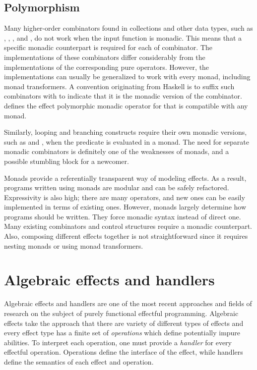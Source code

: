 


\subsection{Polymorphism}
Many higher-order combinators found in collections and other data types, such as , , , and , do not work when the input function is monadic. This means that a specific monadic counterpart is required for each of combinator. The implementations of these combinators differ considerably from the implementations of the corresponding pure operators. However, the implementations can usually be generalized to work with every monad, including monad transformers. A convention originating from Haskell is to suffix such combinators with  to indicate that it is the monadic version of the combinator.  defines the effect polymorphic monadic  operator for  that is compatible with any monad.



Similarly, looping and branching constructs require their own monadic versions, such as  and , when the predicate is evaluated in a monad. The need for separate monadic combinators is definitely one of the weaknesses of monads, and a possible stumbling block for a newcomer.

Monads provide a referentially transparent way of modeling effects. As a result, programs written using monads are modular and can be safely refactored. Expressivity is also high; there are many operators, and new ones can be easily implemented in terms of existing ones. However, monads largely determine how  programs should be written. They force monadic syntax instead of direct one. Many existing combinators and control structures require a monadic counterpart. Also, composing different effects together is not straightforward since it requires nesting monads or using monad transformers.



\section{Algebraic effects and handlers} \label{algebraic-effects}
Algebraic effects and handlers are one of the most recent approaches and fields of research on the subject of purely functional effectful programming. Algebraic effects take the approach that there are variety of different types of effects and every effect type has a finite set of \emph{operations} which define potentially impure abilities. To interpret each operation, one must provide a \emph{handler} for every effectful operation. Operations define the interface of the effect, while handlers define the semantics of each effect and operation.

